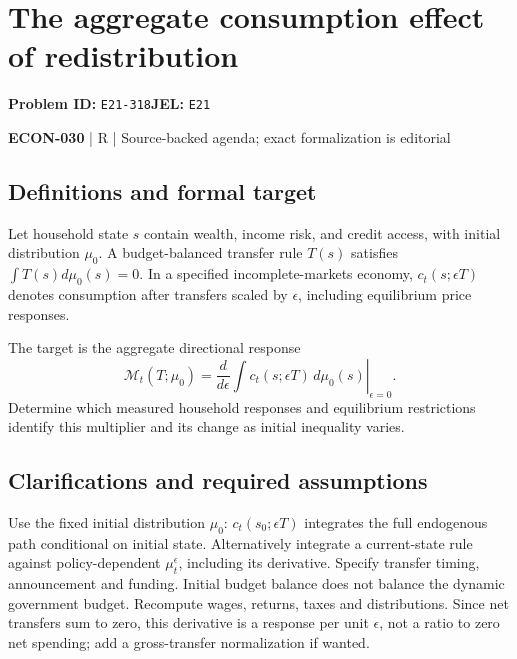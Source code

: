 \documentclass[11pt,a4paper]{article}
\begin{document}
\section*{The aggregate consumption effect of redistribution}
\textbf{Problem ID:} \texttt{E21-318}\quad \textbf{JEL:} \texttt{E21}\par
\label{problem:OP-0609}


\label{audited:ECON-030}

{\sffamily\small\color{muted}\textbf{ECON-030} | R | Source-backed agenda; exact formalization is editorial\par}

\subsection*{Definitions and formal target}

Let household state $s$ contain wealth, income risk, and credit access, with initial distribution $\mu_0$. A budget-balanced transfer rule $T(s)$ satisfies $\int T(s)d\mu_0(s)=0$. In a specified incomplete-markets economy, $c_t(s;\epsilon T)$ denotes consumption after transfers scaled by $\epsilon$, including equilibrium price responses.

The target is the aggregate directional response
\[
 \mathcal M_t(T;\mu_0)=
 \left.\frac{d}{d\epsilon}\int c_t(s;\epsilon T)\,d\mu_0(s)\right|_{\epsilon=0}.
\]
Determine which measured household responses and equilibrium restrictions identify this multiplier and its change as initial inequality varies.

\subsection*{Clarifications and required assumptions}

Use the fixed initial distribution \(\mu_0\): \(c_t(s_0;\epsilon T)\) integrates the full endogenous path conditional on initial state. Alternatively integrate a current-state rule against policy-dependent \(\mu_t^\epsilon\), including its derivative. Specify transfer timing, announcement and funding. Initial budget balance does not balance the dynamic government budget. Recompute wages, returns, taxes and distributions. Since net transfers sum to zero, this derivative is a response per unit \(\epsilon\), not a ratio to zero net spending; add a gross-transfer normalization if wanted.
\end{document}
